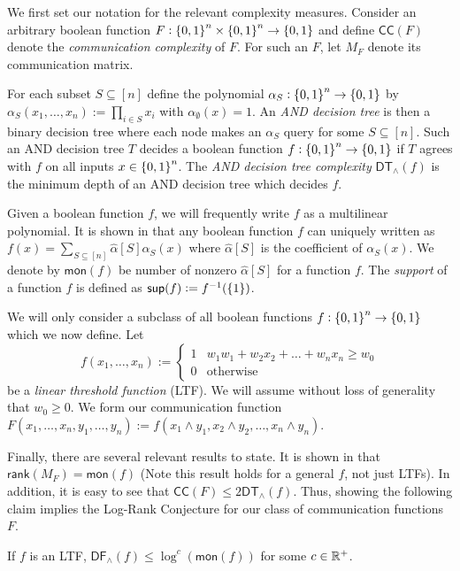We first set our notation for the relevant complexity measures. Consider an arbitrary boolean function $F : \set{0,1}^n\times\set{0,1}^n\to\set{0,1}$ and define $\mathsf{CC}(F)$ denote the \textit{communication complexity} of $F$. For such an $F$, let $M_F$ denote its communication matrix. 
    
    For each subset $S\subseteq [n]$ define the polynomial $\alpha_S : \set{0,1}^n\to \set{0,1}$ by $\alpha_S(x_1,\dots,x_n) := \prod_{i\in S} x_i$ with $\alpha_\emptyset(x) = 1$. An \textit{AND decision tree} is then a binary decision tree where each node makes an $\alpha_S$ query for some $S\subseteq [n]$. Such an AND decision tree $T$ decides a boolean function $f : \set{0,1}^n\to\set{0,1}$ if $T$ agrees with $f$ on all inputs $x\in \set{0,1}^n$. The \textit{AND decision tree complexity} $\mathsf{DT}_{\wedge}(f)$ is the minimum depth of an AND decision tree which decides $f$. 
    
    Given a boolean function $f$, we will frequently write $f$ as a multilinear polynomial. It is shown in \cite{ODonnell2007} that any boolean function $f$ can uniquely written as $f(x) = \sum_{S\subseteq [n]} \hat{\alpha}[S]\alpha_S(x)$ where $\hat{\alpha}[S]$ is the coefficient of $\alpha_S(x)$. We denote by $\mathsf{mon}(f)$ be number of nonzero $\hat{\alpha}[S]$ for a function $f$. The \textit{support} of a function $f$ is defined as $\mathsf{sup}(f) := f^{-1}(\set{1})$.
    
	We will only consider a subclass of all boolean functions $f: \set{0,1}^n\to \set{0,1}$ which we now define. Let 
    \[
    f(x_1,\dots,x_n) := \begin{cases}
		1 & w_1w_1 + w_2x_2 + \dots + w_nx_n \geq w_0\\
        0 & \text{otherwise}
	\end{cases}
    \] be a \textit{linear threshold function} (LTF). We will assume without loss of generality that $w_0 \geq 0$. We form our communication function $F(x_1,\dots,x_n,y_1,\dots,y_n) := f(x_1\wedge y_1,x_2\wedge y_2,\dots,x_n\wedge y_n)$. 
    
    Finally, there are several relevant results to state. It is shown in \cite{Buhrman1999} that $\mathsf{rank}(M_F) = \mathsf{mon}(f)$ (Note this result holds for a general $f$, not just LTFs). In addition, it is easy to see that $\mathsf{CC}(F) \leq 2\mathsf{DT}_{\wedge}(f)$. Thus, showing the following claim implies the Log-Rank Conjecture for our class of communication functions $F$.
    \begin{proposition}
    	If $f$ is an LTF, $\mathsf{DF}_{\wedge}(f) \leq \log^c(\mathsf{mon}(f))$ for some $c \in \mathbb{R}^+$.
    \end{proposition}